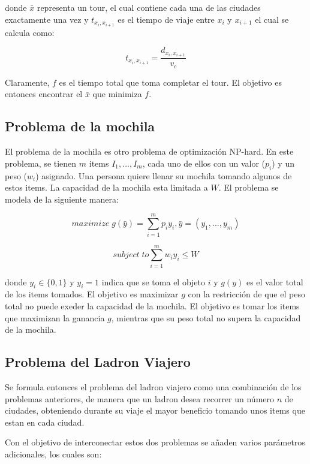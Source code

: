 \documentclass[twocolumn]{IEEEtran}
\begin{document}
donde $\bar{x}$ representa un tour, el cual contiene cada una de las ciudades exactamente una vez
y $t_{x_i,x_{i+1}}$ es el tiempo de viaje entre $x_i$ y $x_{i+1}$ el cual se calcula como:

\begin{equation}
    t_{x_i,x_{i+1}} =
    \frac{d_{x_i,x_{i+1}}}{v_c}
\end{equation}

Claramente, $f$ es el tiempo total que toma completar el tour.
El objetivo es entonces encontrar el $\bar{x}$ que minimiza $f$.

\subsection{Problema de la mochila}
El problema de 
la mochila es otro problema de optimización NP-hard.
En este problema, se tienen $m$ items $I_1, ..., I_m$, cada uno de ellos con
un valor ($p_i$) y un peso ($w_i$) asignado.
Una persona quiere llenar su mochila tomando algunos de estos items.
La capacidad de la mochila esta limitada a $W$.
El problema se modela de la siguiente manera:

\begin{equation}
    maximize \; g(\bar{y}) =
    \sum_{i=1}^m p_iy_i, 
    \bar{y} = (y_1, ..., y_m)
\end{equation}

\begin{equation}
    subject \; to
    \sum_{i=1}^m w_iy_i \leq W
\end{equation}

donde $y_i \in \{0,1\}$ y $y_i = 1$ indica que se toma el objeto $i$ y
$g(y)$ es el valor total de los items tomados. 
El objetivo es maximizar $g$ con la restricción de que el peso total no puede exeder
la capacidad de la mochila.
El objetivo es tomar los items que maximizan la ganancia $g$, mientras que su peso
total no supera la capacidad de la mochila.

\subsection{Problema del Ladron Viajero}
Se formula entonces el problema del ladron viajero como una combinación de los problemas
anteriores, de manera que un ladron desea recorrer un número $n$ de ciudades, obteniendo
durante su viaje el mayor beneficio tomando unos items que estan en cada ciudad. 

Con el objetivo de interconectar estos dos problemas se añaden varios parámetros adicionales,
los cuales son:
\end{document}
